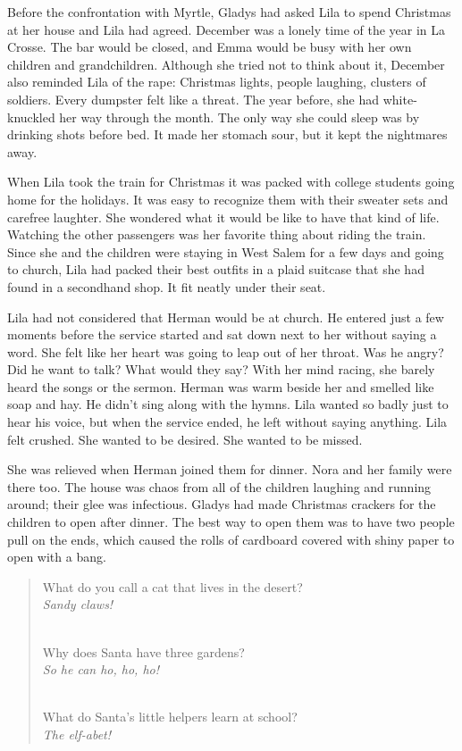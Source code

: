\documentclass[
  letterpaper,
]{book}
\begin{document}
Before the confrontation with Myrtle, Gladys had asked Lila to spend
Christmas at her house and Lila had agreed. December was a lonely time
of the year in La Crosse. The bar would be closed, and Emma would be
busy with her own children and grandchildren. Although she tried not to
think about it, December also reminded Lila of the rape: Christmas
lights, people laughing, clusters of soldiers. Every dumpster felt like
a threat. The year before, she had white-knuckled her way through the
month. The only way she could sleep was by drinking shots before bed. It
made her stomach sour, but it kept the nightmares away.

When Lila took the train for Christmas it was packed with college
students going home for the holidays. It was easy to recognize them with
their sweater sets and carefree laughter. She wondered what it would be
like to have that kind of life. Watching the other passengers was her
favorite thing about riding the train. Since she and the children were
staying in West Salem for a few days and going to church, Lila had
packed their best outfits in a plaid suitcase that she had found in a
secondhand shop. It fit neatly under their seat.

Lila had not considered that Herman would be at church. He entered just
a few moments before the service started and sat down next to her
without saying a word. She felt like her heart was going to leap out of
her throat. Was he angry? Did he want to talk? What would they say? With
her mind racing, she barely heard the songs or the sermon. Herman was
warm beside her and smelled like soap and hay. He didn't sing along with
the hymns. Lila wanted so badly just to hear his voice, but when the
service ended, he left without saying anything. Lila felt crushed. She
wanted to be desired. She wanted to be missed.

She was relieved when Herman joined them for dinner. Nora and her family
were there too. The house was chaos from all of the children laughing
and running around; their glee was infectious. Gladys had made Christmas
crackers for the children to open after dinner. The best way to open
them was to have two people pull on the ends, which caused the rolls of
cardboard covered with shiny paper to open with a bang.

\begin{quote}
What do you call a cat that lives in the desert?\\
\emph{Sandy claws!}\\
\strut \\
Why does Santa have three gardens?\\
\emph{So he can ho, ho, ho!}\\
\strut \\
What do Santa's little helpers learn at school?\\
\emph{The elf-abet!}
\end{quote}
\end{document}
